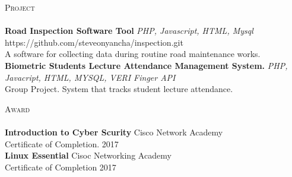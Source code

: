 \documentclass[a4paper]{article}
\newcommand{\lineunder} {
    \vspace*{-8pt} \\
    \hspace*{-18pt} \hrulefill \\
}
\newcommand{\header} [1] {
    {\hspace*{-18pt}\vspace*{6pt} \textsc{#1}}
    \vspace*{-6pt} \lineunder
}
\begin{document}
\header{Project}
{\textbf{Road Inspection Software Tool}} {\sl PHP, Javascript, HTML, Mysql} \hfill https://github.com/steveonyancha/inspection.git\\
A software for collecting data during routine road maintenance works.\\
\vspace*{2mm}
{\textbf{Biometric Students Lecture Attendance Management System.}} {\sl PHP, Javacript, HTML, MYSQL, VERI Finger API} \\
Group Project. System that tracks student lecture attendance.\\
\vspace*{2mm}

\header{Award}
\textbf{Introduction to Cyber Scurity} \hfill Cisco Network Academy\\
Certificate of Completion. \hfill 2017\\
\vspace*{2mm}
\textbf{Linux Essential} \hfill Cisoc Networking Academy\\
Certificate of Completion \hfill 2017\\
\vspace*{2mm}

\ 
\end{document}
